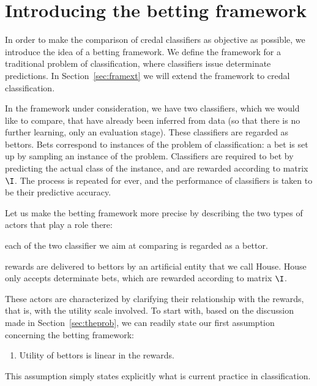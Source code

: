 \documentclass[a4paper,10pt,reqno]{amsart}
\theoremstyle{remark}
\begin{document}

\section{Introducing the betting framework}\label{sec:betfram}

In order to make the comparison of credal classifiers as objective as possible, we introduce the idea of a betting framework. We define the framework for a traditional problem of classification, where classifiers issue determinate predictions. In Section~\ref{sec:framext} we will extend the framework to credal classification.

In the framework under consideration, we have two classifiers, which we would like to compare, that have already been inferred from data (so that there is no further learning, only an evaluation stage). These classifiers are regarded as bettors. Bets correspond to instances of the problem of classification:  a bet is set up by sampling an instance of the problem. Classifiers are required to bet by predicting the actual class of the instance, and are rewarded according to matrix $\I$. The process is repeated for ever, and the performance of classifiers is taken to be their predictive accuracy. 

Let us make the betting framework more precise by describing the two types of actors that play a role there:
\begin{description}[font=\normalfont,style=sameline,leftmargin=0.5cm]
\item[Bettors] each of the two classifier we aim at comparing is regarded as a bettor.
\item[House] rewards are delivered to bettors by an artificial entity that we call House. House only accepts determinate bets, which are rewarded according to matrix $\I$.
\end{description}

These actors are characterized by clarifying their relationship with the rewards, that is, with the utility scale involved. To start with, based on the discussion made in Section~\ref{sec:theprob}, we can readily state our first assumption concerning the betting framework:
\begin{enumerate}[font=\normalfont,label=(A1)]
\item\label{hp:A1} Utility of bettors is linear in the rewards. 
\end{enumerate}
This assumption simply states explicitly what is current practice in classification.
\end{document}
